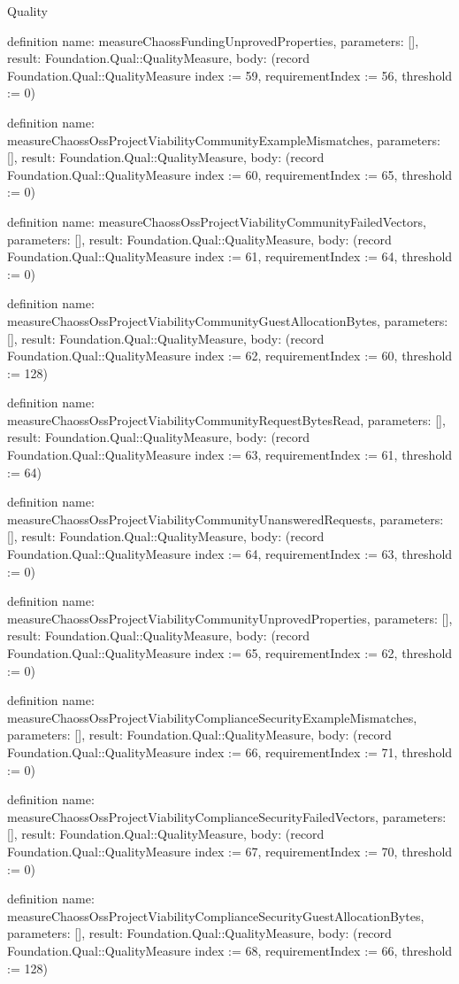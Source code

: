 \begin{lexlean}{Quality}
\begin{semanticmodule}
definition{
  name: measureChaossFundingUnprovedProperties,
  parameters: [],
  result: Foundation.Qual::QualityMeasure,
  body: (record Foundation.Qual::QualityMeasure {index := 59, requirementIndex := 56, threshold := 0})
}

definition{
  name: measureChaossOssProjectViabilityCommunityExampleMismatches,
  parameters: [],
  result: Foundation.Qual::QualityMeasure,
  body: (record Foundation.Qual::QualityMeasure {index := 60, requirementIndex := 65, threshold := 0})
}

definition{
  name: measureChaossOssProjectViabilityCommunityFailedVectors,
  parameters: [],
  result: Foundation.Qual::QualityMeasure,
  body: (record Foundation.Qual::QualityMeasure {index := 61, requirementIndex := 64, threshold := 0})
}

definition{
  name: measureChaossOssProjectViabilityCommunityGuestAllocationBytes,
  parameters: [],
  result: Foundation.Qual::QualityMeasure,
  body: (record Foundation.Qual::QualityMeasure {index := 62, requirementIndex := 60, threshold := 128})
}

definition{
  name: measureChaossOssProjectViabilityCommunityRequestBytesRead,
  parameters: [],
  result: Foundation.Qual::QualityMeasure,
  body: (record Foundation.Qual::QualityMeasure {index := 63, requirementIndex := 61, threshold := 64})
}

definition{
  name: measureChaossOssProjectViabilityCommunityUnansweredRequests,
  parameters: [],
  result: Foundation.Qual::QualityMeasure,
  body: (record Foundation.Qual::QualityMeasure {index := 64, requirementIndex := 63, threshold := 0})
}

definition{
  name: measureChaossOssProjectViabilityCommunityUnprovedProperties,
  parameters: [],
  result: Foundation.Qual::QualityMeasure,
  body: (record Foundation.Qual::QualityMeasure {index := 65, requirementIndex := 62, threshold := 0})
}

definition{
  name: measureChaossOssProjectViabilityComplianceSecurityExampleMismatches,
  parameters: [],
  result: Foundation.Qual::QualityMeasure,
  body: (record Foundation.Qual::QualityMeasure {index := 66, requirementIndex := 71, threshold := 0})
}

definition{
  name: measureChaossOssProjectViabilityComplianceSecurityFailedVectors,
  parameters: [],
  result: Foundation.Qual::QualityMeasure,
  body: (record Foundation.Qual::QualityMeasure {index := 67, requirementIndex := 70, threshold := 0})
}

definition{
  name: measureChaossOssProjectViabilityComplianceSecurityGuestAllocationBytes,
  parameters: [],
  result: Foundation.Qual::QualityMeasure,
  body: (record Foundation.Qual::QualityMeasure {index := 68, requirementIndex := 66, threshold := 128})
}


\end{semanticmodule}
\end{lexlean}
